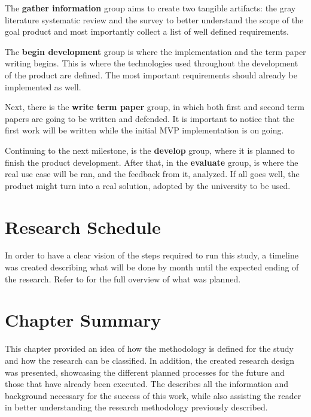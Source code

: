 The \textbf{gather information} group aims to create two tangible artifacts: the gray literature systematic review and the survey to better understand the scope of the goal product and most importantly collect a list of well defined requirements.

The \textbf{begin development} group is where the implementation and the term paper writing begins. This is where the technologies used throughout the development of the product are defined. The most important requirements should already be implemented as well.

Next, there is the \textbf{write term paper} group, in which both first and second term papers are going to be written and defended. It is important to notice that the first work will be written while the initial \ac{MVP} implementation is on going.

Continuing to the next milestone, is the \textbf{develop} group, where it is planned to finish the product development. After that, in the \textbf{evaluate} group, is where the real use case will be ran, and the feedback from it, analyzed. If all goes well, the product might turn into a real solution, adopted by the university to be used.

\section{Research Schedule}\label{sec:met-schedule}

In order to have a clear vision of the steps required to run this study, a timeline was created describing what will be done by month until the expected ending of the research. Refer to  for the full overview of what was planned.



\section{Chapter Summary}\label{sec:met-4}

This chapter provided an idea of how the methodology is defined for the study and how the research can be classified. In addition, the created research design was presented, showcasing the different planned processes for the future and those that have already been executed. The  describes all the information and background necessary for the success of this work, while also assisting the reader in better understanding the research methodology previously described.

